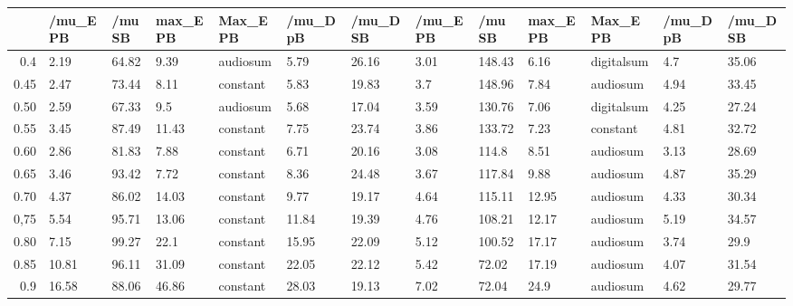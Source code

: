 \begin{table}[ht]
\centering
\begin{tabular}{rllllllllllll}
  \hline
 & /mu\_E PB & /mu SB & max\_E PB & Max\_E PB & /mu\_D pB & /mu\_D SB & /mu\_E PB & /mu SB & max\_E PB & Max\_E PB & /mu\_D pB & /mu\_D SB \\ 
  \hline
0.4 & 2.19 & 64.82 & 9.39 & audiosum & 5.79 & 26.16 & 3.01 & 148.43 & 6.16 & digitalsum & 4.7 & 35.06 \\ 
  0.45 & 2.47 & 73.44 & 8.11 & constant & 5.83 & 19.83 & 3.7 & 148.96 & 7.84 & audiosum & 4.94 & 33.45 \\ 
  0.50 & 2.59 & 67.33 & 9.5 & audiosum & 5.68 & 17.04 & 3.59 & 130.76 & 7.06 & digitalsum & 4.25 & 27.24 \\ 
  0.55 & 3.45 & 87.49 & 11.43 & constant & 7.75 & 23.74 & 3.86 & 133.72 & 7.23 & constant & 4.81 & 32.72 \\ 
  0.60 & 2.86 & 81.83 & 7.88 & constant & 6.71 & 20.16 & 3.08 & 114.8 & 8.51 & audiosum & 3.13 & 28.69 \\ 
  0.65 & 3.46 & 93.42 & 7.72 & constant & 8.36 & 24.48 & 3.67 & 117.84 & 9.88 & audiosum & 4.87 & 35.29 \\ 
  0.70 & 4.37 & 86.02 & 14.03 & constant & 9.77 & 19.17 & 4.64 & 115.11 & 12.95 & audiosum & 4.33 & 30.34 \\ 
  0,75 & 5.54 & 95.71 & 13.06 & constant & 11.84 & 19.39 & 4.76 & 108.21 & 12.17 & audiosum & 5.19 & 34.57 \\ 
  0.80 & 7.15 & 99.27 & 22.1 & constant & 15.95 & 22.09 & 5.12 & 100.52 & 17.17 & audiosum & 3.74 & 29.9 \\ 
  0.85 & 10.81 & 96.11 & 31.09 & constant & 22.05 & 22.12 & 5.42 & 72.02 & 17.19 & audiosum & 4.07 & 31.54 \\ 
  0.9 & 16.58 & 88.06 & 46.86 & constant & 28.03 & 19.13 & 7.02 & 72.04 & 24.9 & audiosum & 4.62 & 29.77 \\ 
   \hline
\end{tabular}
\end{table}
